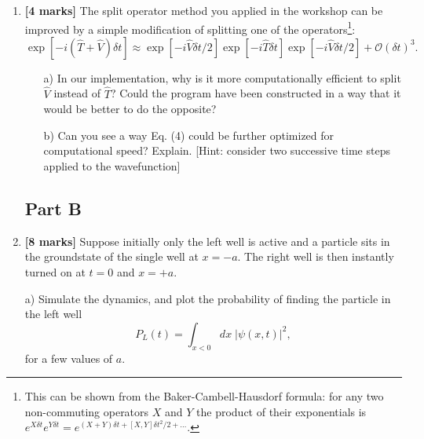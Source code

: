 \documentclass[11pt]{article}
\begin{document}
\begin{enumerate}
\item \textbf{[4 marks]}  The split operator method you applied in the workshop can be improved by a simple modification of splitting one of the operators\footnote{This can be shown from the Baker-Cambell-Hausdorf formula: for any two non-commuting operators $X$ and $Y$ the product of their exponentials is  $e^{X\delta t }e^{Y\delta t} = e^{(X+ Y)\delta t + [X,Y]\delta t^2 /2 + \dots }$. }:
\begin{equation}
\exp\left[- i (\hat T + \hat V) \delta t  \right] \approx \exp \left[ - i \hat V \delta t/2  \right] \exp \left[ - i \hat T \delta t  \right] \exp \left[ - i \hat V \delta t/2  \right]  + \mathcal{O}(\delta t)^3.
\end{equation}
\begin{itemize}
\item[a)] In our implementation, why is it more computationally efficient to split $\hat V$ instead of $\hat T$?  Could the program have been constructed in a way that it would be better to do the opposite?
\item[b)]  Can you see a way Eq. (4) could be further optimized for computational speed? Explain. [Hint: consider two successive time steps applied to the wavefunction]
\end{itemize}

\pagebreak
\subsection*{Part B}
\item \textbf{[8 marks]}  Suppose  initially only the left well is  active and a particle sits in the groundstate of the single well at $x=-a$. The right well is then instantly turned on at $t=0$ and $x=+a$. 

\item [a)] Simulate the dynamics, and plot the probability of finding the particle in the left well 
\begin{equation}
P_L(t) = \int_{x<0} dx\;    |\psi(x,t)|^2,
\end{equation} 
for a few values of $a$.


\end{enumerate}
\end{document}
